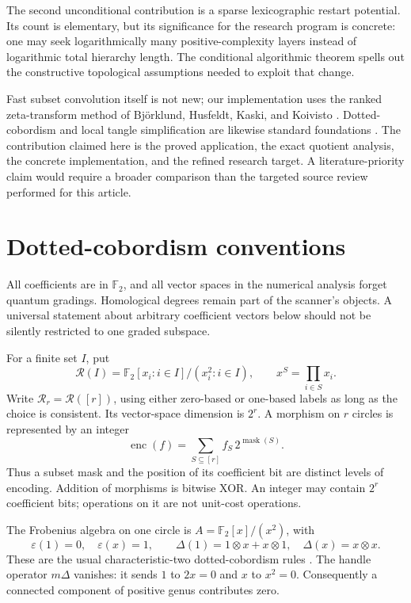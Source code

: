 \documentclass[11pt,letterpaper]{article}
\theoremstyle{definition}
\theoremstyle{remark}
\newcommand{\F}{\mathbb F_2}
\newcommand{\R}{\mathcal R}
\newcommand{\eps}{\varepsilon}
\begin{document}
The second unconditional contribution is a sparse lexicographic restart
potential. Its count is elementary, but its significance for the research
program is concrete: one may seek logarithmically many positive-complexity
layers instead of logarithmic total hierarchy length. The conditional
algorithmic theorem spells out the constructive topological assumptions
needed to exploit that change.

Fast subset convolution itself is not new; our implementation uses the
ranked zeta-transform method of Bj\"orklund, Husfeldt, Kaski, and Koivisto
\cite{bhkk}. Dotted-cobordism and local tangle simplification are likewise
standard foundations \cite{bn-tangles,bn-fast}. The contribution claimed
here is the proved application, the exact quotient analysis, the concrete
implementation, and the refined research target. A literature-priority
claim would require a broader comparison than the targeted source review
performed for this article.

\section{Dotted-cobordism conventions}
\label{sec:conventions}
All coefficients are in $\F$, and all vector spaces in the numerical
analysis forget quantum gradings. Homological degrees remain part of the
scanner's objects. A universal statement about arbitrary coefficient vectors
below should not be silently restricted to one graded subspace.

For a finite set $I$, put
\[
  \R(I)=\F[x_i:i\in I]/(x_i^2:i\in I),
  \qquad x^S=\prod_{i\in S}x_i.
\]
Write $\R_r=\R([r])$, using either zero-based or one-based labels as long as
the choice is consistent. Its vector-space dimension is $2^r$.
A morphism on $r$ circles is represented by an integer
\[
  \operatorname{enc}(f)=\sum_{S\subseteq[r]} f_S\,2^{\operatorname{mask}(S)}.
\]
Thus a subset mask and the position of its coefficient bit are distinct
levels of encoding. Addition of morphisms is bitwise XOR. An integer may
contain $2^r$ coefficient bits; operations on it are not unit-cost operations.

The Frobenius algebra on one circle is $A=\F[x]/(x^2)$, with
\[
 \eps(1)=0,\quad \eps(x)=1,\qquad
 \Delta(1)=1\otimes x+x\otimes1,\quad
 \Delta(x)=x\otimes x.
\]
These are the usual characteristic-two dotted-cobordism rules
\cite{bn-tangles}. The handle operator $m\Delta$ vanishes: it sends $1$ to
$2x=0$ and $x$ to $x^2=0$. Consequently a connected component of positive
genus contributes zero.
\end{document}
